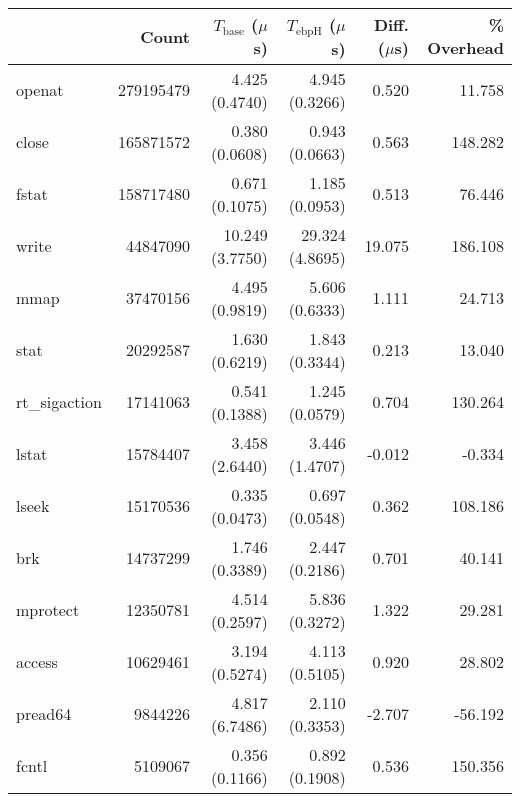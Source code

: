 \begin{tabular}{>{\ttfamily}lrrrrr}
\toprule
\multicolumn{1}{l}{System Call} &      Count & $T_\text{base}$ ($\mu$s) & $T_\text{ebpH}$ ($\mu$s) &  Diff. ($\mu$s) &  \% Overhead \\
\midrule
                         openat &  279195479 &           4.425 (0.4740) &           4.945 (0.3266) &           0.520 &       11.758 \\
                          close &  165871572 &           0.380 (0.0608) &           0.943 (0.0663) &           0.563 &      148.282 \\
                          fstat &  158717480 &           0.671 (0.1075) &           1.185 (0.0953) &           0.513 &       76.446 \\
                          write &   44847090 &          10.249 (3.7750) &          29.324 (4.8695) &          19.075 &      186.108 \\
                           mmap &   37470156 &           4.495 (0.9819) &           5.606 (0.6333) &           1.111 &       24.713 \\
                           stat &   20292587 &           1.630 (0.6219) &           1.843 (0.3344) &           0.213 &       13.040 \\
                  rt\_sigaction &   17141063 &           0.541 (0.1388) &           1.245 (0.0579) &           0.704 &      130.264 \\
                          lstat &   15784407 &           3.458 (2.6440) &           3.446 (1.4707) &          -0.012 &       -0.334 \\
                          lseek &   15170536 &           0.335 (0.0473) &           0.697 (0.0548) &           0.362 &      108.186 \\
                            brk &   14737299 &           1.746 (0.3389) &           2.447 (0.2186) &           0.701 &       40.141 \\
                       mprotect &   12350781 &           4.514 (0.2597) &           5.836 (0.3272) &           1.322 &       29.281 \\
                         access &   10629461 &           3.194 (0.5274) &           4.113 (0.5105) &           0.920 &       28.802 \\
                        pread64 &    9844226 &           4.817 (6.7486) &           2.110 (0.3353) &          -2.707 &      -56.192 \\
                          fcntl &    5109067 &           0.356 (0.1166) &           0.892 (0.1908) &           0.536 &      150.356 \\

\end{tabular}
